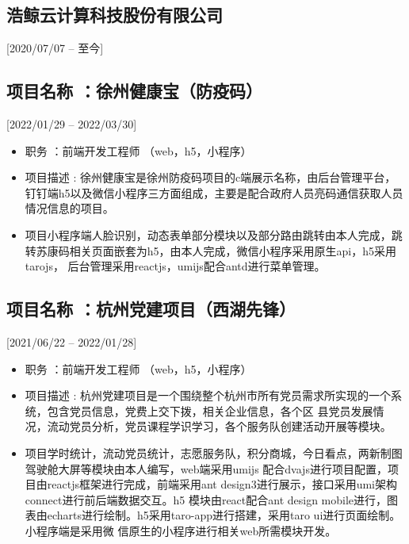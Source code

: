 \documentclass{mycv}
\begin{document}
\subsection{浩鲸云计算科技股份有限公司}[2020/07/07 – 至今]


\subsection{项目名称 ：徐州健康宝（防疫码）}[2022/01/29 – 2022/03/30]

\begin{itemize}
  \item 职务 ：前端开发工程师 （web，h5，小程序）
  \item 项目描述 : 徐州健康宝是徐州防疫码项目的c端展示名称，由后台管理平台，钉钉端h5以及微信小程序三方面组成，主要是配合政府人员亮码通信获取人员情况信息的项目。
  \item  项目小程序端人脸识别，动态表单部分模块以及部分路由跳转由本人完成，跳转苏康码相关页面嵌套为h5，由本人完成，微信小程序采用原生api，h5采用tarojs，
        后台管理采用reactjs，umijs配合antd进行菜单管理。
\end{itemize}

\subsection{项目名称 ：杭州党建项目（西湖先锋）}[2021/06/22 – 2022/01/28]

\begin{itemize}
  \item 职务 ：前端开发工程师 （web，h5，小程序）
  \item 项目描述 : 杭州党建项目是一个围绕整个杭州市所有党员需求所实现的一个系统，包含党员信息，党费上交下拨，相关企业信息，各个区
        县党员发展情况，流动党员分析，党员课程学识学习，各个服务队创建活动开展等模块。
  \item  项目学时统计，流动党员统计，志愿服务队，积分商城，今日看点，两新制图驾驶舱大屏等模块由本人编写，web端采用umijs
        配合dvajs进行项目配置，项目由reactjs框架进行完成，前端采用ant design3进行展示，接口采用umi架构connect进行前后端数据交互。h5
        模块由react配合ant design mobile进行，图表由echarts进行绘制。h5采用taro-app进行搭建，采用taro ui进行页面绘制。小程序端是采用微
        信原生的小程序进行相关web所需模块开发。
\end{itemize}
\end{document}
